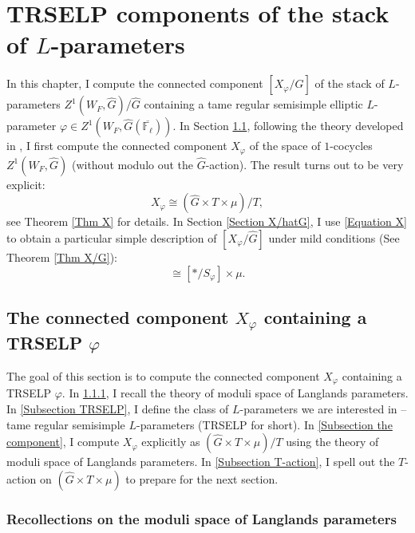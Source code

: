 


\chapter{TRSELP components of the stack of $L$-parameters} \label{Chapter MoLP}

    In this chapter, I compute the connected component $[X_{\varphi}/\hat{G}]$ of the stack of $L$-parameters $Z^1(W_F, \hat{G})/\hat{G}$  containing a tame regular semisimple elliptic $L$-parameter $\varphi \in Z^1(W_F, \hat{G}(\overline{\mathbb{F}_{\ell}}))$. In Section \ref{Section X_phi}, following the theory developed in \cite[Section 3 and Section 4]{dat2022ihes}, I first compute the connected component $X_{\varphi}$ of the space of $1$-cocycles $Z^1(W_F, \hat{G})$ (without modulo out the $\hat{G}$-action).
    The result turns out to be very explicit:
    \begin{equation}\label{Equation X}
    	X_{\varphi} \cong (\hat{G} \times T \times \mu)/T,
    \end{equation}
    see Theorem \ref{Thm X} for details. In Section \ref{Section X/hatG}, I use \ref{Equation X} to obtain a particular simple description of $[X_{\varphi}/\hat{G}]$ under mild conditions (See Theorem \ref{Thm X/G}):
    \begin{equation}
    	[X_{\varphi}/\hat{G}] \cong [*/S_{\varphi}] \times \mu.
    \end{equation}
    
	\section{The connected component $X_{\varphi}$ containing a TRSELP $\varphi$}\label{Section X_phi}
	
	The goal of this section is to compute the connected component $X_{\varphi}$ containing a TRSELP $\varphi$. In \ref{Subsection MoLP}, I recall the theory of moduli space of Langlands parameters. In \ref{Subsection TRSELP}, I define the class of $L$-parameters we are interested in -- tame regular semisimple $L$-parameters (TRSELP for short). In \ref{Subsection the component}, I compute $X_{\varphi}$ explicitly as $(\hat{G}\times T\times \mu)/T$ using the theory of moduli space of Langlands parameters. In \ref{Subsection T-action}, I spell out the $T$-action on $(\hat{G}\times T\times \mu)$ to prepare for the next section.
	
	\subsection{Recollections on the moduli space of Langlands parameters}\label{Subsection MoLP}
	
